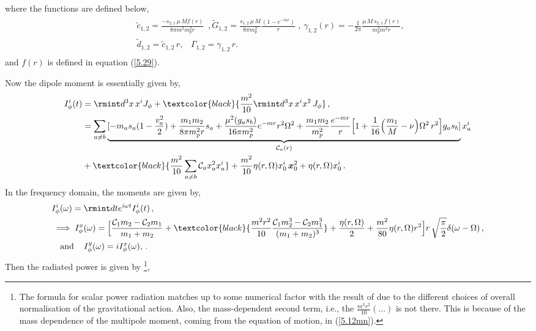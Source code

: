 where the functions are defined below,
\begin{align}
\begin{split}
&\tilde{c}_{1,2}=\frac{-s_{2,1}\,\mu\, M f(r)}{8\pi m^2m_p^2r}\,\,\,,
    \tilde{G}_{1,2}=\frac{s_{1,2}\,\mu\, M}{8\pi m_p^2}\frac{(1-e^{-mr})}{r}\,\, ,\,\gamma_{1,2}(r)=-\frac{1}{2\pi}\frac{\mu \,M\, s_{2,1}\,f(r)}{m_p^2 m^2r},\,\\& \tilde{d}_{1,2}=\tilde{c}_{1,2}\, r,\,\,\,\,\,
    \Gamma_{1,2}=\gamma_{1,2}\, r.
    \end{split}
\end{align}
and  $f(r)$ is defined in equation (\ref{5.29}). \par
 Now the dipole moment is essentially given by,
\begin{align}
    \begin{split}
        I_{\phi}^{i}(t)&=\rmint d^3 x\,x^{i} J_{\phi}+\textcolor{black}{\frac{m^2}{10} \rmint d^3 x\,  x^i x^2\,J_{\phi} }\,,\\ &
        =\sum_{a\ne b}\underbrace{[-m_a s_a(1-\frac{v_a^2}{2})+\frac{ m_1 m_2}{8\pi m_p^2r}s_a +\frac{\mu^2 (g_a s_b)}{16\pi m_p^2}e^{-mr}r^2 \Omega^2+\frac{m_1m_2}{m_p^2}\frac{e^{-mr}}{r}\Big[1+\frac{1}{16}\Big(\frac{m_1}{M}-\nu\Big)\Omega^2\,r^2\Big]g_a s_b]}_{\mathcal{C}_{a}(r)}x_a^{i}\\ &
        +\textcolor{black}{\frac{m^2}{10}\sum_{a\ne b}\mathcal{C}_a x_a^2 x_a^{i}}+\frac{m^2}{10}\eta(r,\Omega){x}_0^i\,\boldsymbol{x}_0^2+\eta(r,\Omega){x}_0^i\,.
    \end{split}
\end{align}
In the frequency domain, the moments are given by,
\begin{align}
    \begin{split}
      &  I_{\phi}^{i}(\omega)=\rmint dt e^{i\omega t}I_{\phi}^{i}(t)\,,\\ &
        \implies I_{\phi}^{x}(\omega)=\Big[ \frac{\mathcal{C}_1 m_2-\mathcal{C}_2 m_1}{m_1+m_2}+\textcolor{black}{\frac{m^2r^2}{10}\frac{\mathcal{C}_1m_2^3-\mathcal{C}_2 m_1^3}{(m_1+m_2)^3} }+\frac{\eta(r,\Omega)}{2}+\frac{m^2}{80}\eta(r,\Omega)r^2\Big]r\,\sqrt{\frac{\pi}{2}}\delta(\omega-\Omega)\,,\\&\quad \text{and}\quad \,I_{\phi}^{y}(\omega)=i I_{\phi}^{x}(\omega),\,.
    \end{split}
\end{align}
Then the radiated power is given by \footnote{The formula for scalar power radiation matches up to some numerical factor with the result of \cite{Huang:2018pbu} due to the different choices of overall normalisation of the gravitational action. Also, the mass-dependent second term, i.e., the $\frac{m^2r^2}{10}(...)$ is not there. This is because of the mass dependence of the multipole moment, coming from the equation of motion, in (\ref{5.12mn}). },\par

